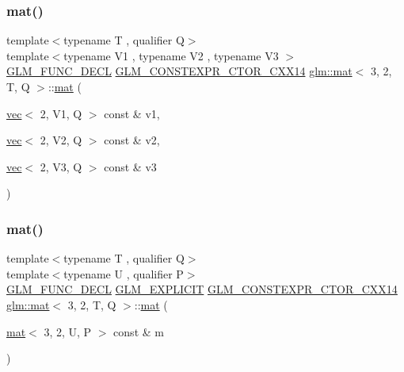 \mbox{\label{structglm_1_1mat_3_013_00_012_00_01_t_00_01_q_01_4_a05957fdeea53e736c395bc5c818f87cd}} 
\subsubsection{\texorpdfstring{mat()}{mat()}\hspace{0.1cm}{\footnotesize\ttfamily [8/21]}}
{\footnotesize\ttfamily template$<$typename T , qualifier Q$>$ \\
template$<$typename V1 , typename V2 , typename V3 $>$ \\
\mbox{\hyperlink{setup_8hpp_ab2d052de21a70539923e9bcbf6e83a51}{G\+L\+M\+\_\+\+F\+U\+N\+C\+\_\+\+D\+E\+CL}} \mbox{\hyperlink{setup_8hpp_a0900f9145e68bf6061b6f5e7be3fa751}{G\+L\+M\+\_\+\+C\+O\+N\+S\+T\+E\+X\+P\+R\+\_\+\+C\+T\+O\+R\+\_\+\+C\+X\+X14}} \mbox{\hyperlink{structglm_1_1mat}{glm\+::mat}}$<$ 3, 2, T, Q $>$\+::\mbox{\hyperlink{structglm_1_1mat}{mat}} (\begin{DoxyParamCaption}\item[{\mbox{\hyperlink{structglm_1_1vec}{vec}}$<$ 2, V1, Q $>$ const \&}]{v1,  }\item[{\mbox{\hyperlink{structglm_1_1vec}{vec}}$<$ 2, V2, Q $>$ const \&}]{v2,  }\item[{\mbox{\hyperlink{structglm_1_1vec}{vec}}$<$ 2, V3, Q $>$ const \&}]{v3 }\end{DoxyParamCaption})}

\mbox{\label{structglm_1_1mat_3_013_00_012_00_01_t_00_01_q_01_4_ad6c2490865785641ce19a850997227ff}} 
\subsubsection{\texorpdfstring{mat()}{mat()}\hspace{0.1cm}{\footnotesize\ttfamily [9/21]}}
{\footnotesize\ttfamily template$<$typename T , qualifier Q$>$ \\
template$<$typename U , qualifier P$>$ \\
\mbox{\hyperlink{setup_8hpp_ab2d052de21a70539923e9bcbf6e83a51}{G\+L\+M\+\_\+\+F\+U\+N\+C\+\_\+\+D\+E\+CL}} \mbox{\hyperlink{setup_8hpp_a6c74f5a5e7b134ab69023ff9a30d4d5d}{G\+L\+M\+\_\+\+E\+X\+P\+L\+I\+C\+IT}} \mbox{\hyperlink{setup_8hpp_a0900f9145e68bf6061b6f5e7be3fa751}{G\+L\+M\+\_\+\+C\+O\+N\+S\+T\+E\+X\+P\+R\+\_\+\+C\+T\+O\+R\+\_\+\+C\+X\+X14}} \mbox{\hyperlink{structglm_1_1mat}{glm\+::mat}}$<$ 3, 2, T, Q $>$\+::\mbox{\hyperlink{structglm_1_1mat}{mat}} (\begin{DoxyParamCaption}\item[{\mbox{\hyperlink{structglm_1_1mat}{mat}}$<$ 3, 2, U, P $>$ const \&}]{m }\end{DoxyParamCaption})}

